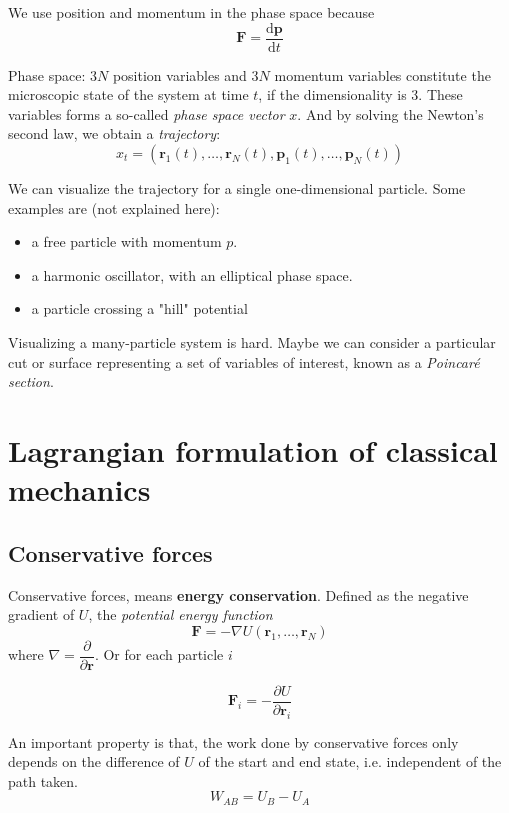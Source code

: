 \documentclass[
  10pt,
  twoside,
  openany,
  b5paper, %
  colorscheme = bootstrap-v4, %
]{qyxf-book}
\newcommand{\der}[2]{\dfrac{\md #1}{\md #2}}
\newcommand{\p}[2]{\dfrac{\partial #1}{\partial #2}}
\newcommand{\md}{\mathrm{d}}
\newcommand{\vF}{\boldsymbol{F}}
\newcommand{\vr}{\boldsymbol{r}}
\newcommand{\vp}{\boldsymbol{p}}
\newcommand{\vl}{\boldsymbol{l}}
\begin{document}
We use position and momentum in the phase space because
\begin{equation}
	\vF=\der{\vp}{t} \label{rp}
\end{equation}

Phase space: $3N$ position variables and $3N$ momentum variables constitute the microscopic state of the system at time $t$, if the dimensionality is 3. These variables forms a so-called \textit{phase space vector} $x$. And by solving the Newton's second law, we obtain a \textit{trajectory}:
\begin{equation}
	x_t=\left(\vr_1(t), \dots, \vr_N(t), \vp_1(t), \dots, \vp_N(t)\right)
\end{equation}

We can visualize the trajectory for a single one-dimensional particle. Some examples are (not explained here):
\begin{itemize}
	\item a free particle with momentum $p$.
	\item a harmonic oscillator, with an elliptical phase space.
	\item a particle crossing a "hill" potential
\end{itemize}

Visualizing a many-particle system is hard. Maybe we can consider a particular cut or surface representing a set of variables of interest, known as a \textit{Poincar{\'e} section}.

\section{Lagrangian formulation of classical mechanics}

\subsection{Conservative forces}
Conservative forces, means \textbf{energy conservation}. Defined as the negative gradient of $U$, the \textit{potential energy function}
\begin{equation}
	\vF=-\nabla U(\vr_1,\dots,\vr_N)
\end{equation}
where $\nabla=\p{}{\vr}$. Or for each particle $i$
\begin{tcolorbox}
	\begin{equation}
		\vF_i=-\p{U}{\vr_i} \label{eq:conservative}
	\end{equation}
\end{tcolorbox}
An important property is that, the work done by conservative forces only depends on the difference of $U$ of the start and end state, i.e. independent of the path taken. 
$$
W_{AB}=U_B-U_A
$$
\end{document}
